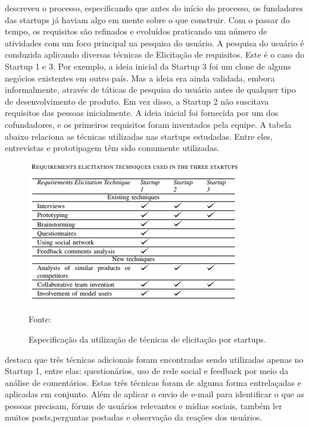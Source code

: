 \cite{rafiq2017requirements} descreveu o processo, especificando que antes do início do processo, os fundadores das startups já haviam
algo em mente sobre o que construir. Com o passar
do tempo, os requisitos são refinados e evoluídos praticando
um número de atividades com um foco principal na pesquisa do usuário.
A pesquisa do usuário é conduzida aplicando diversas
técnicas de Elicitação de requisitos. Este é o caso do Startup 1 e 3.
Por exemplo, a ideia inicial da Startup 3 foi um clone de
alguns negócios existentes em outro país. Mas a ideia era
ainda validada, embora informalmente, através de táticas de pesquisa do usuário antes de qualquer tipo de desenvolvimento de produto. Em vez disso, a Startup 2 não suscitava requisitos das pessoas inicialmente. A ideia inicial foi fornecida por um dos cofundadores, e os primeiros
requisitos foram inventados pela equipe.
A tabela abaixo relaciona as técnicas utilizadas nas startups estudadas.
Entre eles, entrevistas e prototipagem têm sido comumente utilizadas.

\begin{figure}[!htb]
\centering
\label{fig01}
\includegraphics[keepaspectratio=true,scale=0.8]{figuras/especificacao_tecnicas_por_startup.png}
\caption{Especificação da utilização de técnicas de elicitação por startups.}
{Fonte: \cite{rafiq2017requirements}}
\end{figure}

\cite{rafiq2017requirements} destaca que três técnicas adicionais foram encontradas sendo utilizadas apenas no Startup 1, entre elas: questionários, uso de rede social e feedback por meio da análise de comentários. Estas três técnicas foram de alguma forma entrelaçadas e aplicadas em conjunto. Além de aplicar o envio de e-mail para identificar o que as pessoas precisam, fóruns de usuários relevantes e mídias sociais, também ler muitos posts,perguntas postadas e observação da reações dos usuários.

